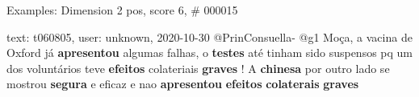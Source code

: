 \begin{frame}{Examples: Dimension 2 pos, score 6, \# 000015}
\footnotesize
\begin{exampleblock}{text: t060805, user: unknown, 2020-10-30}
@PrinConsuella- @g1 Moça, a vacina de Oxford já \textbf{apresentou} algumas 
falhas, o \textbf{testes} até tinham sido suspensos pq um dos voluntários teve 
\textbf{efeitos} colateriais \textbf{graves} ! A \textbf{chinesa} por outro 
lado se mostrou \textbf{segura} e eficaz e nao \textbf{apresentou} 
\textbf{efeitos} \textbf{colaterais} \textbf{graves} 
\end{exampleblock}
\end{frame}

